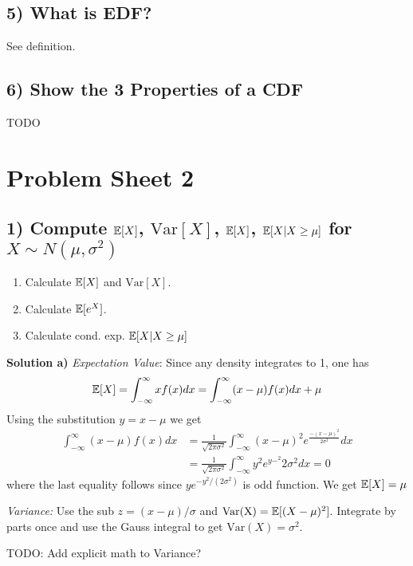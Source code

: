 %
%
\subsection*{5) What is EDF?} See definition.

%
%
\subsection*{6) Show the 3 Properties of a CDF} TODO

%
%
\section*{Problem Sheet 2}
%
%
\subsection*{1) Compute $\mathbb{E}[X]$, $\text{Var}[X]$, $\mathbb{E}[X]$, $\mathbb{E}[X | X \geq \mu]$ for $X\sim N(\mu, \sigma^2)$}
\begin{enumerate}[label=(\alph*)]
    \item Calculate $\mathbb{E}[X]$ and $\text{Var}[X]$.
    \item Calculate $\mathbb{E}[e^X]$.
    \item Calculate cond. exp. $\mathbb{E}[X | X \geq \mu]$
\end{enumerate}
\textbf{Solution a)}
\textit{Expectation Value}: Since any density integrates to 1, one has
\[
    \mathbb{E}[X] = \int_{-\infty}^\infty xf(x) dx
          = \int_{-\infty}^\infty (x-\mu) f(x) dx + \mu
\]
Using the substitution $y=x-\mu$ we get
\begin{align*}
    \int_{-\infty}^\infty(x - \mu)f(x) dx
    &= \frac{1}{\sqrt{2\pi\sigma^2}} \int_{-\infty}^\infty(x-\mu)^2
    e^{\frac{-(x-\mu)^2}{2\sigma^2}} dx \\
    &= \frac{1}{\sqrt{2\pi\sigma^2}} \int_{-\infty}^\infty y^2
    e^{y-^2}{2\sigma^2} dx = 0
\end{align*}
where the last equality follows since $ye^{-y^2 / (2\sigma^2)}$ is odd function.
We get $\mathbb{E}[X] = \mu$

\textit{Variance:} Use the sub $z = (x-\mu)/\sigma$ and $\text{Var(X)} = \mathbb{E}[(X - \mu)^2]$. Integrate by parts once and use the Gauss integral to get $\text{Var}(X) = \sigma^2$.

TODO: Add explicit math to Variance?

